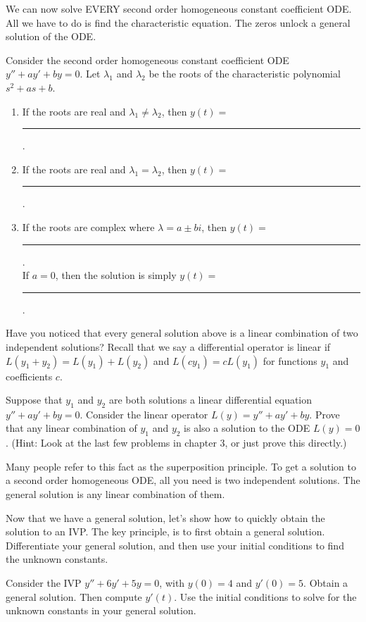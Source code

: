 We can now solve EVERY second order homogeneous constant coefficient ODE.  All we have to do is find the characteristic equation. The zeros unlock a general solution of the ODE.
\begin{problem}
 Consider the second order homogeneous constant coefficient ODE $y''+ay'+by=0$.  Let $\lambda_1$ and $\lambda_2$ be the roots of the characteristic polynomial $s^2+as+b$.  
\begin{enumerate}
 \item If the roots are real and $\lambda_1 \neq \lambda_2$, then $y(t) = $\rule{1in}{.5pt}.
 \item If the roots are real and $\lambda_1  =   \lambda_2$, then $y(t) = $\rule{1in}{.5pt}.
 \item If the roots are complex where $\lambda = a\pm bi$, then $y(t) = $\rule{1in}{.5pt}. \\
 If $a=0$, then the solution is simply $y(t) = $\rule{1in}{.5pt}.
\end{enumerate}

\end{problem}

Have you noticed that every general solution above is a linear combination of two independent solutions?  Recall that we say a differential operator is linear if $L(y_1+y_2) = L(y_1)+L(y_2)$ and $L(cy_1)=cL(y_1)$ for functions $y_1$ and coefficients $c$.  
\begin{problem}
 Suppose that $y_1$ and $y_2$ are both solutions a linear differential equation $y''+a y'+by=0$.  Consider the linear operator $L(y) = y''+ay'+by$.  Prove that any linear combination of $y_1$ and $y_2$ is also a solution to the ODE $L(y)=0$. (Hint:  Look at the last few problems in chapter 3, or just prove this directly.)  

 Many people refer to this fact as the superposition principle. To get a solution to a second order homogeneous ODE, all you need is two independent solutions. The general solution is any linear combination of them.
\end{problem}

Now that we have a general solution, let's show how to quickly obtain the solution to an IVP. The key principle, is to first obtain a general solution. Differentiate your general solution, and then use your initial conditions to find the unknown constants.

\begin{problem}
 Consider the IVP $y''+6y'+5y=0$, with $y(0)=4$ and $y'(0)=5$.  Obtain a general solution. Then compute $y'(t)$. Use the initial conditions to solve for the unknown constants in your general solution. 
\end{problem}

